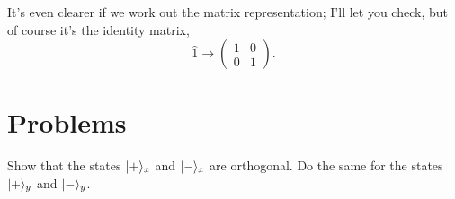 It's even clearer if we work out the matrix representation; I'll let you check, but of course it's the identity matrix,
\begin{equation}
\hat{1} \to \begin{pmatrix} 1 & 0 \\ 0 & 1 \end{pmatrix}.
\end{equation}

\section*{Problems}
%

\begin{problem}[Orthogonality]
Show that the states $| + \rangle_x$ and $| - \rangle_x$ are orthogonal.  Do the same for the states $| + \rangle_y$ and $| - \rangle_y$. 
\end{problem}


